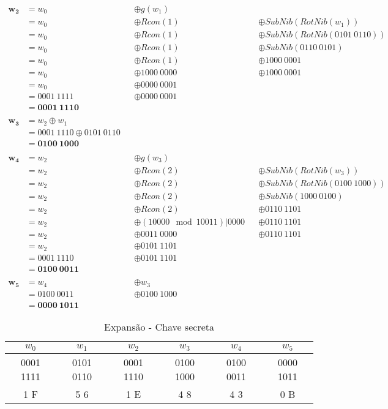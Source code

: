 \documentclass[
    article,            %
    11pt,               %
    oneside,            %
    a4paper,            %
    english,            %
    brazil,             %
    sumario=tradicional,
    ]{abntex2}
\begin{document}
\begin{align*}
  \mathbf{w_2} &= w_0 &&\oplus g(w_1) \\
      &= w_0 &&\oplus Rcon(1) &&\oplus SubNib(RotNib(w_1)) \\
      &= w_0 &&\oplus Rcon(1) &&\oplus SubNib(RotNib(0101 \ 0110)) \\
      &= w_0 &&\oplus Rcon(1) &&\oplus SubNib(0110 \ 0101) \\
      &= w_0 &&\oplus Rcon(1) &&\oplus 1000 \ 0001 \\
      &= w_0 &&\oplus 1000 \ 0000 &&\oplus 1000 \ 0001 \\
      &= w_0 &&\oplus 0000 \ 0001 \\
      &= 0001 \ 1111 &&\oplus 0000 \ 0001 \\
      &= \mathbf{0001 \ 1110} \\\\
  \mathbf{w_3} &= w_2 \oplus w_1 \\
      &= 0001 \ 1110 \oplus 0101 \ 0110 \\
      &= \mathbf{0100 \ 1000} \\\\
  \mathbf{w_4} &= w_2 &&\oplus g(w_3) \\
      &= w_2 &&\oplus Rcon(2) &&\oplus SubNib(RotNib(w_3)) \\
      &= w_2 &&\oplus Rcon(2) &&\oplus SubNib(RotNib(0100 \ 1000)) \\
      &= w_2 &&\oplus Rcon(2) &&\oplus SubNib(1000 \ 0100) \\
      &= w_2 &&\oplus Rcon(2) &&\oplus 0110 \ 1101 \\
      &= w_2 &&\oplus (10000\mod{10011}) | 0000 &&\oplus 0110 \ 1101 \\
      &= w_2 &&\oplus 0011 \ 0000 &&\oplus 0110 \ 1101 \\
      &= w_2 &&\oplus 0101 \ 1101 \\
      &= 0001 \ 1110 &&\oplus 0101 \ 1101 \\
      &= \mathbf{0100 \ 0011} \\\\
  \mathbf{w_5} &= w_4 &&\oplus w_3 \\
      &= 0100 \ 0011 &&\oplus 0100 \ 1000 \\
      &= \mathbf{0000 \ 1011}
\end{align*}

\begin{table}[H]
\centering
\caption{Expansão - Chave secreta}
\label{expansion-key-bits}
\begin{tabular}{|c|c|c|c|c|c|}
\hline \cellcolor[HTML]{C0C0C0} $w_0$   & \cellcolor[HTML]{C0C0C0} $w_1$   & \cellcolor[HTML]{C0C0C0} $w_2$   & \cellcolor[HTML]{C0C0C0} $w_3$   & \cellcolor[HTML]{C0C0C0} $w_4$   & \cellcolor[HTML]{C0C0C0} $w_5$    \\ \hline
0001 1111 & 0101 0110 & 0001 1110 & 0100 1000 & 0100 0011 & 0000 1011  \\ \hline
1 F       & 5 6       & 1 E       & 4 8       & 4 3       & 0 B  \\ \hline
\end{tabular}
\end{table}
\end{document}

